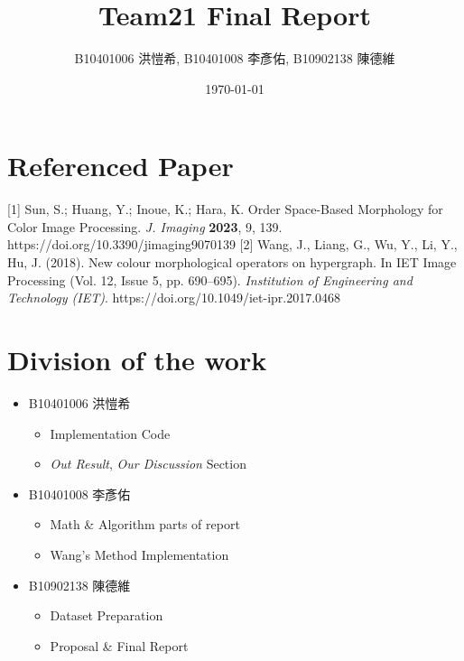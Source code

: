 \documentclass[12pt,a4paper]{article}
\title{Team21 Final Report}
\author{B10401006 洪愷希, B10401008 李彥佑, B10902138 陳德維}   %
\date{\today}   %
\begin{document}
\begin{titlepage}
    \maketitle
    \thispagestyle{empty}
\end{titlepage}

% 



\clearpage



\section*{Referenced Paper}
 [1] Sun, S.; Huang, Y.; Inoue, K.; Hara, K. Order Space-Based Morphology for Color Image Processing. \textit{J. Imaging} \textbf{2023}, 9, 139. https://doi.org/10.3390/jimaging9070139
[2] Wang, J., Liang, G., Wu, Y., Li, Y., Hu, J. (2018). New colour morphological operators on hypergraph. In IET Image Processing (Vol. 12, Issue 5, pp. 690–695). \textit{Institution of Engineering and Technology (IET)}. https://doi.org/10.1049/iet-ipr.2017.0468


\section*{Division of the work}
\begin{itemize}
    \item B10401006 洪愷希
          \begin{itemize}
              \item Implementation Code
              \item \textit{Out Result}, \textit{Our Discussion} Section
          \end{itemize}
    \item B10401008 李彥佑
          \begin{itemize}
              \item Math \& Algorithm parts of report
              \item Wang's Method Implementation
          \end{itemize}
    \item B10902138 陳德維
          \begin{itemize}
              \item Dataset Preparation
              \item Proposal \& Final Report
          \end{itemize}
\end{itemize}
\end{document}
